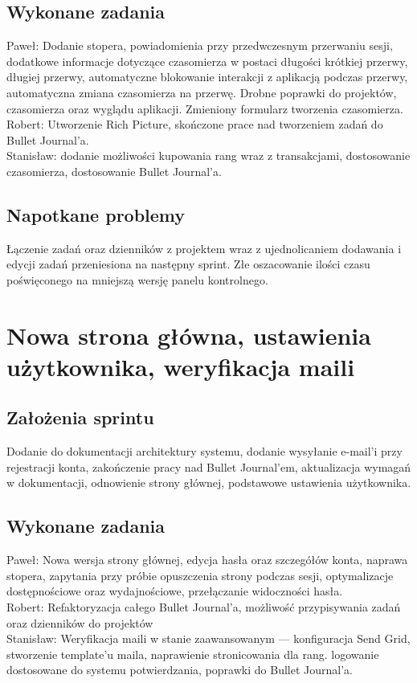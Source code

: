 \documentclass[a4paper,11pt]{report}
\begin{document}
\subsection {Wykonane zadania}
Paweł: Dodanie stopera, powiadomienia przy przedwczesnym przerwaniu sesji, dodatkowe informacje dotyczące czasomierza w postaci długości krótkiej przerwy, długiej przerwy, automatyczne blokowanie interakcji z aplikacją podczas przerwy, automatyczna zmiana czasomierza na przerwę. Drobne poprawki do projektów, czasomierza oraz wyglądu aplikacji. Zmieniony formularz tworzenia czasomierza.\\
Robert: Utworzenie Rich Picture, skończone prace nad tworzeniem zadań do Bullet Journal'a.\\
Stanisław: dodanie możliwości kupowania rang wraz z transakcjami, dostosowanie czasomierza, dostosowanie Bullet Journal'a.\\
\subsection {Napotkane problemy}
Łączenie zadań oraz dzienników z projektem wraz z ujednolicaniem dodawania i edycji zadań przeniesiona na następny sprint. Złe oszacowanie ilości czasu poświęconego na mniejszą wersję panelu kontrolnego.

\section {Nowa strona główna, ustawienia użytkownika, weryfikacja maili}
\subsection {Założenia sprintu}
Dodanie do dokumentacji architektury systemu, dodanie wysyłanie e-mail'i przy rejestracji konta,
 zakończenie pracy nad Bullet Journal'em, aktualizacja wymagań w dokumentacji, odnowienie strony głównej,
 podstawowe ustawienia użytkownika.
\subsection {Wykonane zadania}
Paweł: Nowa wersja strony głównej, edycja hasła oraz szczegółów konta,
 naprawa stopera, zapytania przy próbie opuszczenia strony podczas sesji,
 optymalizacje dostępnościowe oraz wydajnościowe, przełączanie widoczności hasła.\\
Robert: Refaktoryzacja całego Bullet Journal’a, możliwość przypisywania zadań oraz dzienników do projektów\\
Stanisław: Weryfikacja maili w stanie zaawansowanym — konfiguracja Send Grid,
 stworzenie template'u maila, naprawienie stronicowania dla rang.
 logowanie dostosowane do systemu potwierdzania, poprawki do Bullet Journal'a.\\
\end{document}
